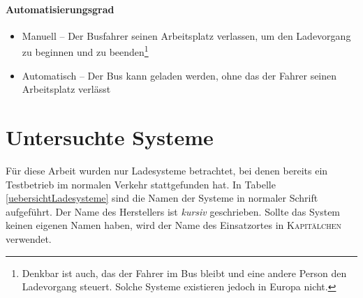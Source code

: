 \paragraph{Automatisierungsgrad}
\begin{itemize}
	\item Manuell – Der Busfahrer seinen Arbeitsplatz verlassen, um den Ladevorgang zu beginnen und zu beenden\footnote{Denkbar ist auch, das der Fahrer im Bus bleibt und eine andere Person den Ladevorgang steuert. Solche Systeme existieren jedoch in Europa nicht.}
	\item Automatisch – Der Bus kann geladen werden, ohne das der Fahrer seinen Arbeitsplatz verlässt
\end{itemize}

\section{Untersuchte Systeme}
Für diese Arbeit wurden nur Ladesysteme betrachtet, bei denen bereits ein Testbetrieb im normalen Verkehr stattgefunden hat. In Tabelle \ref{uebersichtLadesysteme} sind die Namen der Systeme in normaler Schrift aufgeführt. Der Name des Herstellers ist \emph{kursiv} geschrieben. Sollte das System keinen eigenen Namen haben, wird der Name des Einsatzortes in \textsc{Kapitälchen} verwendet.
